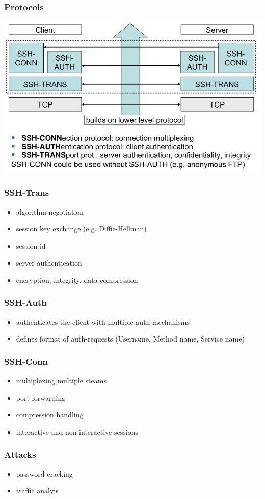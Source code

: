 \documentclass[english, leagacyboxes, nologo]{latex4ei/latex4ei_sheet}
\begin{document}
{  \subsubsection{Protocols}
  \includegraphics[width=\columnwidth]{img/sshproto.png}

  \subsubsection{SSH-Trans}
  \begin{itemize}
  \item algorithm negotiation
  \item session key exchange (e.g. Diffie-Hellman)
  \item session id
  \item server authentication
  \item encryption, integrity, data compression
  \end{itemize}

  \subsubsection{SSH-Auth}
  \begin{itemize}
  \item authenticates the client with multiple auth mechanisms
  \item defines format of auth-requests (Username, Method name, Service name)
  \end{itemize}

  \subsubsection{SSH-Conn}
  \begin{itemize}
  \item multiplexing multiple steams
  \item port forwarding
  \item compression handling
  \item interactive and non-interactive sessions
  \end{itemize}


  \subsubsection{Attacks}
  \begin{itemize}
  \item password cracking
  \item traffic analyis
  \end{itemize}
  }
\end{document}
